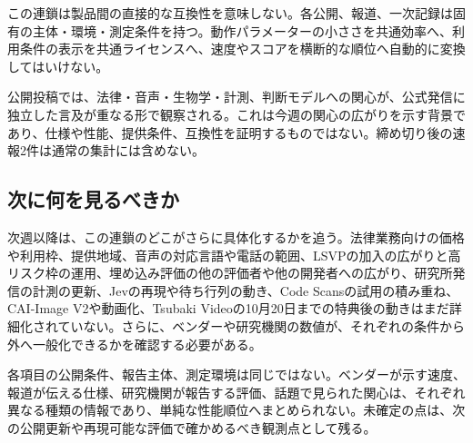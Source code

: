 この連鎖は製品間の直接的な互換性を意味しない。各公開、報道、一次記録は固有の主体・環境・測定条件を持つ。動作パラメーターの小ささを共通効率へ、利用条件の表示を共通ライセンスへ、速度やスコアを横断的な順位へ自動的に変換してはいけない。

\begin{communitynote}
公開投稿では、法律・音声・生物学・計測、判断モデルへの関心が、公式発信に独立した言及が重なる形で観察される。これは今週の関心の広がりを示す背景であり、仕様や性能、提供条件、互換性を証明するものではない。締め切り後の速報2件は通常の集計には含めない。
\end{communitynote}

\clearpage
\subsection*{次に何を見るべきか}
次週以降は、この連鎖のどこがさらに具体化するかを追う。法律業務向けの価格や利用枠、提供地域、音声の対応言語や電話の範囲、LSVPの加入の広がりと高リスク枠の運用、埋め込み評価の他の評価者や他の開発者への広がり、研究所発信の計測の更新、Jevの再現や待ち行列の動き、Code Scansの試用の積み重ね、CAI-Image V2や動画化、Tsubaki Videoの10月20日までの特典後の動きはまだ詳細化されていない。さらに、ベンダーや研究機関の数値が、それぞれの条件から外へ一般化できるかを確認する必要がある。

\begin{claimboundary}[この総括の読み方]
各項目の公開条件、報告主体、測定環境は同じではない。ベンダーが示す速度、報道が伝える仕様、研究機関が報告する評価、話題で見られた関心は、それぞれ異なる種類の情報であり、単純な性能順位へまとめられない。未確定の点は、次の公開更新や再現可能な評価で確かめるべき観測点として残る。
\end{claimboundary}
